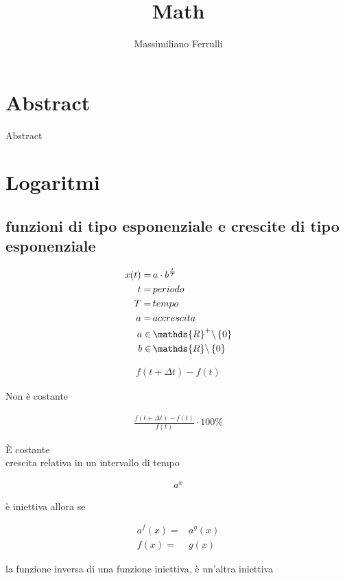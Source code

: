\documentclass{article}
\title{Math}
\author{Massimiliano Ferrulli}
\date{}
\begin{document}
\maketitle

\section*{Abstract}
Abstract

\pagebreak

\tableofcontents
\pagebreak

\section{Logaritmi}
\subsection{funzioni di tipo esponenziale e crescite di tipo esponenziale}
\begin{align*}  
    x(t)=&\,a \cdot b^\frac{t}{T}
    \\t =&\,periodo
    \\T =&\,tempo
    \\a =&\,accrescita
    \\a \in& \, \mathds{R}^+ \symbol{92}\,\{0\} 
    \\b \in& \, \mathds{R} \symbol{92}\,\{0\} 
\end{align*}

\begin{align*}
f(t+\Delta t)-f(t) 
\end{align*}
\begin{center}
Non è costante
\end{center}
\begin{align*}
 \frac{f(t+\Delta t)-f(t)}{f(t)} \cdot 100\%
\end{align*}
\begin{center}
È costante
\\ crescita relativa in un intervallo di tempo
\end{center}

\begin{align*}
    a^x 
\end{align*}    
\begin{center}   
è iniettiva allora se
\end{center}
\begin{align*}
         a^f(x) =& a^g(x)
        \\ f(x) =& g(x)
\end{align*}
\begin{center}
    la funzione inversa di una funzione iniettiva, è un'altra iniettiva
\end{center}
\end{document}
